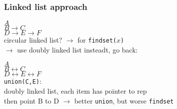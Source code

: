\subsubsection*{Linked list approach}

$A$ \\
\indent $B \rightarrow C$ \\
\indent $D \rightarrow E \rightarrow F$ \\

\noindent circular linked list? $\rightarrow$ for \texttt{findset($x$)} \\
$\rightarrow$ use doubly linked list insteadt, go back: 

$A$ \\
\indent $B \leftrightarrow C$ \\
\indent $D \leftrightarrow E \leftrightarrow F$ \\

\noindent \texttt{union(C,E)}: \\

\noindent doubly linked list, each item has pointer to rep \\
then point B to D $\rightarrow$ better \texttt{union}, but worse \texttt{findset}   























